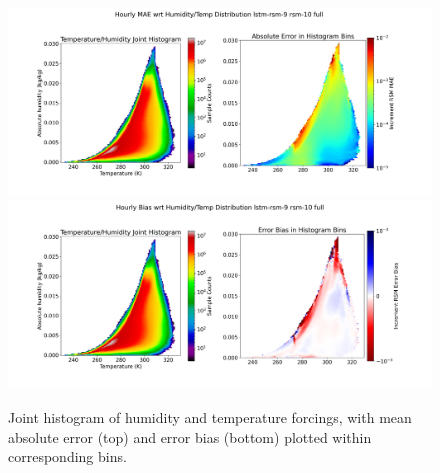 \begin{figure}[hp!]
    \centering

    \includegraphics[width=.96\linewidth,draft=false]{figures/grid-eval_lstm-rsm-9_full/eval-grid_full_lstm-rsm-9_rsm-10_hist-humidity-temp_abs-err.png}
    \includegraphics[width=.96\linewidth,draft=false]{figures/grid-eval_lstm-rsm-9_full/eval-grid_full_lstm-rsm-9_rsm-10_hist-humidity-temp_bias.png}

    \caption{Joint histogram of humidity and temperature forcings, with mean absolute error (top) and error bias (bottom) plotted within corresponding bins.}
    \label{lstm-rsm-9-hthist}
\end{figure}

